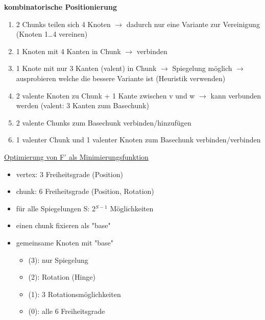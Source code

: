 \documentclass[12pt,a4paper]{article}
\begin{document}
\parbox{\linewidth}{
\textbf{kombinatorische Positionierung}
\begin{enumerate}
	\item 2 Chunks teilen sich 4 Knoten $\rightarrow$ dadurch nur eine Variante zur Vereinigung (Knoten 1…4 vereinen)
	\item 1 Knoten mit 4 Kanten in Chunk $\rightarrow$ verbinden
	\item 1 Knote mit nur 3 Kanten (valent) in Chunk $\rightarrow$ Spiegelung möglich $\rightarrow$ ausprobieren welche die bessere Variante ist (Heuristik verwenden)
	\item 2 valente Knoten zu Chunk + 1 Kante zwischen v und w $\rightarrow$ kann verbunden werden (valent: 3 Kanten zum Basechunk)
	\item 2 valente Chunks zum Basechunk verbinden/hinzufügen
	\item 1 valenter Chunk und 1 valenter Knoten zum Basechunk verbinden/verbinden
\end{enumerate}
}

\underline{Optimierung von F' als Minimierungsfunktion}
\begin{itemize}
	\item vertex: 3 Freiheitsgrade (Position)
	\item chunk: 6 Freiheitsgrade (Position, Rotation)
	\item für alle Spiegelungen S: 2$^{S-1}$ Möglichkeiten
	\item einen chunk fixieren als "base"
	\item gemeinsame Knoten mit "base"
	\begin{itemize}
		\item (3): nur Spiegelung
		\item (2): Rotation (Hinge)
		\item (1): 3 Rotationsmöglichkeiten
		\item (0): alle 6 Freiheitsgrade
	\end{itemize}
\end{itemize}
\end{document}
